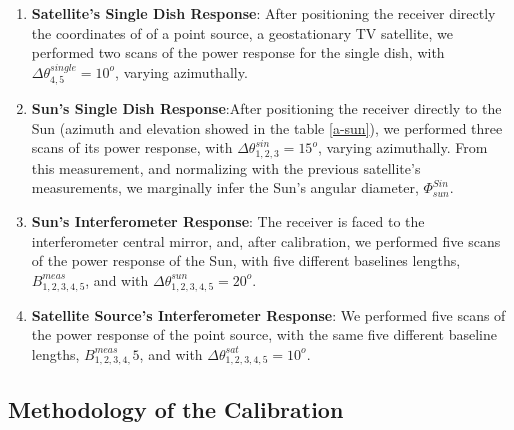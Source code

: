 \begin{enumerate}
 \item {\bf Satellite's Single Dish Response}: After positioning the receiver directly the coordinates of of a point source, \eg a geostationary TV satellite, we performed two scans of the power response  for the  single dish, with $\Delta \theta^{single}_{4,5} = 10^o$, varying azimuthally.

 \item {\bf Sun's Single Dish Response}:After positioning the receiver directly to the Sun (azimuth and elevation showed in the table \ref{a-sun}), we performed three scans of its power response, with $\Delta \theta^{sin}_{1,2,3} = 15^o$, varying azimuthally. From this measurement, and normalizing with the previous satellite's measurements, we marginally infer the Sun's angular diameter, $\Phi_{sun}^{Sin}$.

 \item {\bf Sun's Interferometer Response}: The receiver is  faced to the interferometer central mirror, and, after calibration, we performed five scans of the power response of the Sun, with five different baselines lengths,  $B^{meas}_{1,2,3,4,5}$, and  with $\Delta \theta^{sun}_{1,2,3,4,5} = 20^o$.

 \item {\bf Satellite Source's Interferometer Response}: We performed five scans of the power response of the point source, with the same five different baseline lengths, $B^{meas}_{1,2,3,4,}5$, and  with $\Delta \theta^{sat}_{1,2,3,4,5} = 10^o$.
\end{enumerate}


\bigskip


\subsection{Methodology of the Calibration}\label{calibration}

